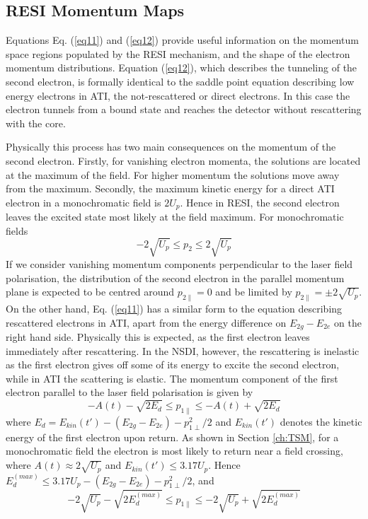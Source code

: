 \documentclass[11pt]{article}
\numberwithin{equation}{section}
\begin{document}
\subsection{RESI Momentum Maps} \label{ch:RESI_mom}

Equations Eq. (\ref{eq11}) and (\ref{eq12}) provide useful information on the momentum space regions populated by the RESI mechanism, and the shape of the electron momentum distributions. Equation (\ref{eq12}), which describes the tunneling of the second electron, is formally identical to the saddle point equation describing low energy electrons in ATI, the not-rescattered or direct electrons. In this case the electron tunnels from a bound state and reaches the detector without rescattering with the core\cite{shaaran_2010_laserinduced}.
\par
Physically this process has two main consequences on the momentum of the second electron. Firstly, for vanishing electron momenta, the solutions are located at the maximum of the field. For higher momentum the solutions move away from the maximum. Secondly, the maximum kinetic energy for a direct ATI electron in a monochromatic field is $2U_p$\cite{becker_1995_light}. Hence in RESI, the second electron leaves the excited state most likely at the field maximum. For monochromatic fields
\begin{equation} \label{eq:p2constr}
    -2 \sqrt{U_p} \leq p_2 \leq 2 \sqrt{U_p}
\end{equation}
\nelwline
If we consider vanishing momentum components perpendicular to the laser field polarisation, the distribution of the second electron in the parallel momentum plane is expected to be centred around $p_{2\parallel} = 0$ and be limited by $p_{2\parallel} = \pm 2\sqrt{U_p}$.
\newline
On the other hand, Eq. (\ref{eq11}) has a similar form to the equation describing rescattered electrons in ATI\cite{figueirademorissonfaria_2002_highorder}, apart from the energy difference on $E_{2g} - E_{2e}$ on the right hand side. Physically this is expected, as the first electron leaves immediately after rescattering. In the NSDI, however, the rescattering is inelastic as the first electron gives off some of its energy to excite the second electron, while in ATI the scattering is elastic. The momentum component of the first electron parallel to the laser field polarisation is given by 
\begin{equation}
    -A(t) - \sqrt{2E_d} \leq p_{1\parallel} \leq -A(t) + \sqrt{2E_d}
\end{equation}
where
$E_d = E_{kin}(t') - (E_{2g} - E_{2e}) - p_{1\perp}^2/2$ and $E_{kin}(t')$ denotes the kinetic energy of the first electron upon return. As shown in Section \ref{ch:TSM}, for a monochromatic field the electron is most likely to return near a field crossing, where $A(t) \approx 2\sqrt{U_p}$ and $E_{kin}(t') \leq 3.17U_p$. Hence $E_{d}^{(max)}\leq3.17U_p - (E_{2g} - E_{2e}) - p_{1\perp}^2/2$, and 
\begin{equation} \label{eq:p1constr}
    -2\sqrt{U_p} -\sqrt{2E_{d}^{(max)}} \leq p_{1\parallel} \leq -2\sqrt{U_p} + \sqrt{2E_{d}^{(max)}}
\end{equation}
\end{document}
